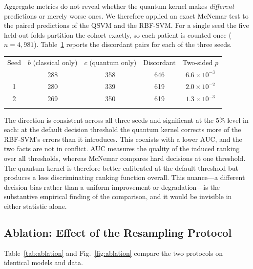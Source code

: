 \documentclass{ws-ijqi}
\begin{document}
Aggregate metrics do not reveal whether the quantum kernel makes
\emph{different} predictions or merely worse ones. We therefore applied an
exact McNemar test to the paired predictions of the QSVM and the RBF-SVM. For a
single seed the five held-out folds partition the cohort exactly, so each
patient is counted once ($n=4{,}981$). Table~\ref{tab:mcnemar} reports the
discordant pairs for each of the three seeds.

\begin{table}[htb]
{\fontsize{8}{10}\selectfont
\begin{tabular}{@{}ccccc@{}}
\toprule
Seed & $b$ (classical only) & $c$ (quantum only) & Discordant & Two-sided $p$ \\
\colrule
0 & 288 & 358 & 646 & $6.6\times10^{-3}$ \\
1 & 280 & 339 & 619 & $2.0\times10^{-2}$ \\
2 & 269 & 350 & 619 & $1.3\times10^{-3}$ \\
\botrule
\end{tabular}}
\label{tab:mcnemar}
\end{table}

The direction is consistent across all three seeds and significant at the 5\%
level in each: at the default decision threshold the quantum kernel corrects
more of the RBF-SVM's errors than it introduces. This coexists with a lower
AUC, and the two facts are not in conflict. AUC measures the quality of the
induced ranking over all thresholds, whereas McNemar compares hard decisions at
one threshold. The quantum kernel is therefore better calibrated at the default
threshold but produces a less discriminating ranking function overall. This
nuance---a different decision bias rather than a uniform improvement or
degradation---is the substantive empirical finding of the comparison, and it
would be invisible in either statistic alone.

\subsection{Ablation: Effect of the Resampling Protocol}
\label{sec:ablation}

Table~\ref{tab:ablation} and Fig.~\ref{fig:ablation} compare the two protocols
on identical models and data.
\end{document}
